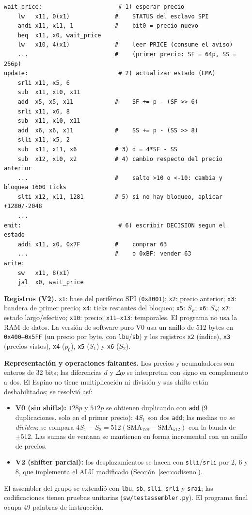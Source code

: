 \documentclass[11pt,letterpaper]{article}
\renewcommand{\_}{\textunderscore\allowbreak}
\begin{document}
\begin{lstlisting}[style=asm,caption={Núcleo de \texttt{sw/trade.s} (versión final V2).},label={lst:asm}]
wait_price:                      # 1) esperar precio
    lw   x11, 0(x1)             #    STATUS del esclavo SPI
    andi x11, x11, 1            #    bit0 = precio nuevo
    beq  x11, x0, wait_price
    lw   x10, 4(x1)             #    leer PRICE (consume el aviso)
    ...                         #    (primer precio: SF = 64p, SS = 256p)
update:                          # 2) actualizar estado (EMA)
    srli x11, x5, 6
    sub  x11, x10, x11
    add  x5, x5, x11            #    SF += p - (SF >> 6)
    srli x11, x6, 8
    sub  x11, x10, x11
    add  x6, x6, x11            #    SS += p - (SS >> 8)
    slli x11, x5, 2
    sub  x11, x11, x6           # 3) d = 4*SF - SS
    sub  x12, x10, x2           # 4) cambio respecto del precio anterior
    ...                         #    salto >10 o <-10: cambia y bloquea 1600 ticks
    slti x12, x11, 1281         # 5) si no hay bloqueo, aplicar +1280/-2048
    ...
emit:                            # 6) escribir DECISION segun el estado
    addi x11, x0, 0x7F          #    comprar 63
    ...                         #    o 0xBF: vender 63
write:
    sw   x11, 8(x1)
    jal  x0, wait_price
\end{lstlisting}

\textbf{Registros (V2).} \texttt{x1}: base del periférico SPI (\texttt{0x8001\_0000}); \texttt{x2}: precio anterior; \texttt{x3}: bandera de primer precio; \texttt{x4}: ticks restantes del bloqueo; \texttt{x5}: $S_F$; \texttt{x6}: $S_S$; \texttt{x7}: estado largo/efectivo; \texttt{x10}: precio; \texttt{x11}--\texttt{x13}: temporales. El programa no usa la RAM de datos. La versión de software puro V0 usa un anillo de 512 bytes en \texttt{0x400--0x5FF} (un precio por byte, con \texttt{lbu}/\texttt{sb}) y los registros \texttt{x2} (índice), \texttt{x3} (precios vistos), \texttt{x4} ($p_0$), \texttt{x5} ($S_1$) y \texttt{x6} ($S_2$).

\textbf{Representación y operaciones faltantes.} Los precios y acumuladores son enteros de 32 bits; las diferencias $d$ y $\Delta p$ se interpretan con signo en complemento a dos. El Espino no tiene multiplicación ni división y sus shifts están deshabilitados; se resolvió así:
\begin{itemize}
  \item \textbf{V0 (sin shifts):} $128p$ y $512p$ se obtienen duplicando con \texttt{add} (9 duplicaciones, solo en el primer precio); $4S_1$ son dos \texttt{add}; las medias \emph{no se dividen}: se compara $4S_1-S_2=512(\mathrm{SMA}_{128}-\mathrm{SMA}_{512})$ con la banda de $\pm512$. Las sumas de ventana se mantienen en forma incremental con un anillo de precios.
  \item \textbf{V2 (shifter parcial):} los desplazamientos se hacen con \texttt{slli}/\texttt{srli} por 2, 6 y 8, que implementa el ALU modificado (Sección~\ref{sec:codiseno}).
\end{itemize}
El assembler del grupo se extendió con \texttt{lbu}, \texttt{sb}, \texttt{slli}, \texttt{srli} y \texttt{srai}; las codificaciones tienen pruebas unitarias (\texttt{sw/test\_assembler.py}). El programa final ocupa 49 palabras de instrucción.
\end{document}
